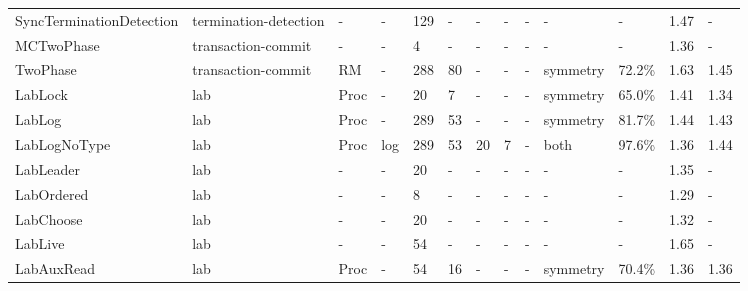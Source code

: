 \begin{table}[t]
\begin{tabular}{lllllllllllll}
SyncTerminationDetection & termination-detection & - & - & 129 & - & - & - & - & - & - & 1.47 & - \\
MCTwoPhase & transaction-commit & - & - & 4 & - & - & - & - & - & - & 1.36 & - \\
TwoPhase & transaction-commit & RM & - & 288 & 80 & - & - & - & symmetry & 72.2\% & 1.63 & 1.45 \\
LabLock & lab & Proc & - & 20 & 7 & - & - & - & symmetry & 65.0\% & 1.41 & 1.34 \\
LabLog & lab & Proc & - & 289 & 53 & - & - & - & symmetry & 81.7\% & 1.44 & 1.43 \\
LabLogNoType & lab & Proc & log & 289 & 53 & 20 & 7 & - & both & 97.6\% & 1.36 & 1.44 \\
LabLeader & lab & - & - & 20 & - & - & - & - & - & - & 1.35 & - \\
LabOrdered & lab & - & - & 8 & - & - & - & - & - & - & 1.29 & - \\
LabChoose & lab & - & - & 20 & - & - & - & - & - & - & 1.32 & - \\
LabLive & lab & - & - & 54 & - & - & - & - & - & - & 1.65 & - \\
LabAuxRead & lab & Proc & - & 54 & 16 & - & - & - & symmetry & 70.4\% & 1.36 & 1.36 \\
\bottomrule
\end{tabular}
\end{table}
